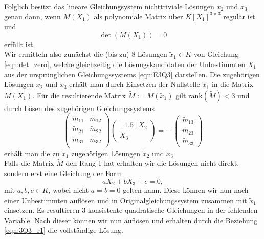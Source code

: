 \documentclass[a4paper,oneside, 11pt, openany%
]{article}
\newcommand{\coloneqq}{:=}
\theoremstyle{custom}
\theoremstyle{custom}
\begin{document}
	Folglich besitzt das lineare Gleichungsystem nichttriviale Lösungen $x_2$ und $x_3$ genau dann, wenn $M\left( X_{1}\right)$ als polynomiale Matrix über $K[X_{1}]^{3 \times 3}$ regulär ist und \begin{equation}\label{eqn:det_zero}
		\det\left(M\left( X_{1}\right)  \right) = 0
	\end{equation}
	erfüllt ist.\\
	Wir ermitteln also zunächst die (bis zu) 8 Lösungen $\tilde{x}_{1} \in K$ von Gleichung \eqref{eqn:det_zero}, welche gleichzeitig die Lösungskandidaten der Unbestimmten $X_{1}$ aus der ursprünglichen Gleichungssystems \eqref{eqn:E3Q3} darstellen. Die zugehörigen Lösungen $x_{2}$ und $x_{3}$ erhält man durch Einsetzen der Nullstelle $\tilde{x}_{1}$ in die Matrix $M\left( X_1\right) $.
	Für die resultierende Matrix $ \tilde{M} \coloneqq M(\tilde{x}_{1})$ gilt $\text{rank}\left(\tilde{M}\right) < 3$ und durch Lösen des zugehörigen Gleichungssystems
	\begin{equation}\label{eqn:M_lsg}
		\begin{pmatrix}
			\tilde{m}_{11} & \tilde{m}_{12}\\
			\tilde{m}_{21} & \tilde{m}_{22}\\
			\tilde{m}_{31} & \tilde{m}_{32}\\
		\end{pmatrix}
		\begin{pmatrix}[1.5]
			X_{2}\\
			X_{3}
		\end{pmatrix}
		= -\ \begin{pmatrix}
			\tilde{m}_{13}\\
			\tilde{m}_{23}\\
			\tilde{m}_{33}
		\end{pmatrix}
	\end{equation}
	erhält man die zu $\tilde{x}_{1}$ zugehörigen Lösungen $\tilde{x}_{2}$ und $\tilde{x}_{3}$.\\
	Falls die Matrix $\tilde{M}$ den Rang 1 hat erhalten wir die Lösungen nicht direkt, sondern erst eine Gleichung der Form 
	\begin{equation}\label{eqn:3Q3_r1}
		a X_2 + b X_3 + c = 0,
	\end{equation}
	mit $a,b,c \in K$, wobei nicht $a=b=0$ gelten kann.
	Diese können wir nun nach einer Unbestimmten auflösen und in Originalgleichungssystem zusammen mit $\tilde{x}_1$ einsetzen. Es resultieren 3 konsistente quadratische Gleichungen in der fehlenden Variable. Nach dieser können wir nun auflösen und erhalten durch die Beziehung \eqref{eqn:3Q3_r1} die vollständige Lösung.
\end{document}
